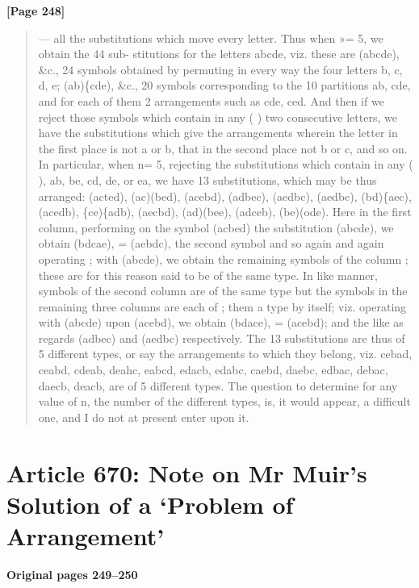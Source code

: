 \documentclass[11pt,a4paper]{book}
\begin{document}
\textbf{[Page 248]}\\[0.2cm]
\begin{quote}
---
all the substitutions which move every letter. Thus when »= 5, we obtain the 44 sub-
stitutions for the letters abcde, viz. these are
(abcde), \&c., 24 symbols obtained by permuting in every way the four letters
b, c, d, e;
(ab)\{cde), \&c., 20 symbols corresponding to the 10 partitions ab, cde, and for each
of them 2 arrangements such as cde, ced.
And then if we reject those symbols which contain in any ( ) two consecutive letters,
we have the substitutions which give the arrangements wherein the letter in the
first place is not a or b, that in the second place not b or c, and so on. In
particular, when n= 5, rejecting the substitutions which contain in any ( ), ab, be, cd, de,
or ea, we have 13 substitutions, which may be thus arranged:
(acted), (ac)(bed), (acebd), (adbec), (aedbc),
(aedbc), (bd)\{aec),
(acedb), \{ce)\{adb),
(aecbd), (ad)(bee),
(adceb), (be)(ode).
Here in the first column, performing on the symbol (acbed) the substitution (abcde),
we obtain (bdcae), = (aebdc), the second symbol and so again and again operating
;
with (abcde), we obtain the remaining symbols of the column ; these are for this
reason said to be of the same type. In like manner, symbols of the second column
are of the same type but the symbols in the remaining three columns are each of
;
them a type by itself; viz. operating with (abcde) upon (acebd), we obtain (bdace),
= (acebd); and the like as regards (adbec) and (aedbc) respectively. The 13 substitutions
are thus of 5 different types, or say the arrangements to which they belong, viz.
cebad, ceabd, cdeab, deahc, eabcd,
edacb, edabc,
caebd, daebc,
edbac, debac,
daecb, deacb,
are of 5 different types. The question to determine for any value of n, the number
of the different types, is, it would appear, a difficult one, and I do not at present
enter upon it.
\end{quote}

\newpage

\section*{Article 670: Note on Mr Muir's Solution of a `Problem of Arrangement'}
\textbf{Original pages 249--250}\\[0.3cm]
\end{document}
